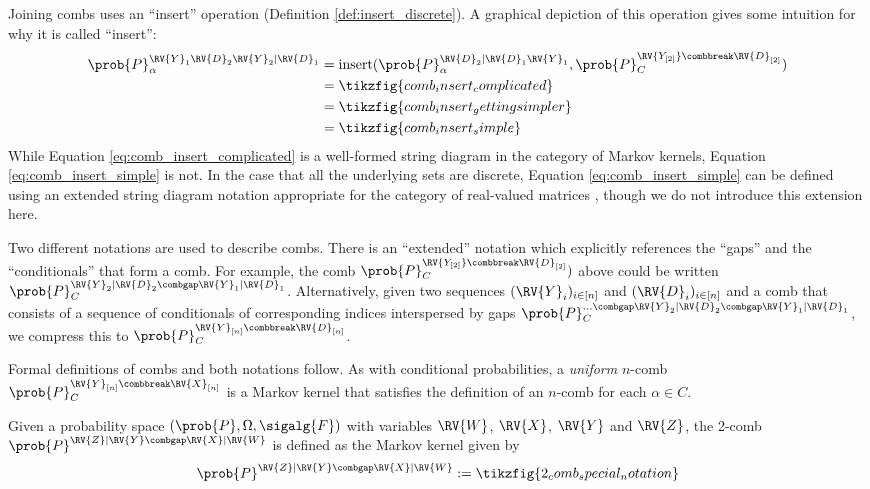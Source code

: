 Joining combs uses an ``insert'' operation (Definition \ref{def:insert_discrete}).  A graphical depiction of this operation gives some intuition for why it is called ``insert'':
\begin{align}
    \prob{P}_\alpha^{\RV{Y}_{1}\RV{D}_2\RV{Y}_2|\RV{D}_1}&=\text{insert}(\prob{P}_\alpha^{\RV{D}_2|\RV{D}_1\RV{Y}_1},\prob{P}_C^{\RV{Y_{[2]}}\combbreak\RV{D}_{[2]}})\\
    &= \tikzfig{comb_insert_complicated}\label{eq:comb_insert_complicated}\\
    &= \tikzfig{comb_insert_gettingsimpler}\\
    &= \tikzfig{comb_insert_simple}\label{eq:comb_insert_simple}
\end{align}
While Equation \ref{eq:comb_insert_complicated} is a well-formed string diagram in the category of Markov kernels, Equation \ref{eq:comb_insert_simple} is not. In the case that all the underlying sets are discrete, Equation \ref{eq:comb_insert_simple} can be defined using an extended string diagram notation appropriate for the category of real-valued matrices \citep{jacobs_causal_2019}, though we do not introduce this extension here.

Two different notations are used to describe combs. There is an ``extended'' notation which explicitly references the ``gaps'' and the ``conditionals'' that form a comb. For example, the comb $\prob{P}_C^{\RV{Y_{[2]}}\combbreak\RV{D}_{[2]}})$ above could be written $\prob{P}_C^{\RV{Y}_{2}|\RV{D}_2\combgap \RV{Y}_1|\RV{D}_1}$. Alternatively, given two sequences $(\RV{Y}_i)_{i\in [n]}$ and $(\RV{D}_i)_{i\in [n]}$ and a comb that consists of a sequence of conditionals of corresponding indices interspersed by gaps $\prob{P}_C^{...\combgap \RV{Y}_{2}|\RV{D}_2\combgap \RV{Y}_1|\RV{D}_1}$, we compress this to $\prob{P}_C^{\RV{Y}_{[n]}\combbreak \RV{D}_{[n]}}$.

Formal definitions of combs and both notations follow. As with conditional probabilities, a \emph{uniform} $n$-comb $\prob{P}_C^{\RV{Y}_{[n]}\combbreak \RV{X}_{[n]}}$ is a Markov kernel that satisfies the definition of an $n$-comb for each $\alpha\in C$.

\begin{definition}[2-comb]\label{def:2-comb}
Given a probability space $(\prob{P},\Omega,\sigalg{F})$ with variables $\RV{W}$, $\RV{X}$, $\RV{Y}$ and $\RV{Z}$, the 2-comb $\prob{P}^{\RV{Z}|\RV{Y}\combgap\RV{X}|\RV{W}}$ is defined as the Markov kernel given by
\begin{align}
    \prob{P}^{\RV{Z}|\RV{Y}\combgap\RV{X}|\RV{W}} := \tikzfig{2_comb_special_notation}
\end{align}
\end{definition}

